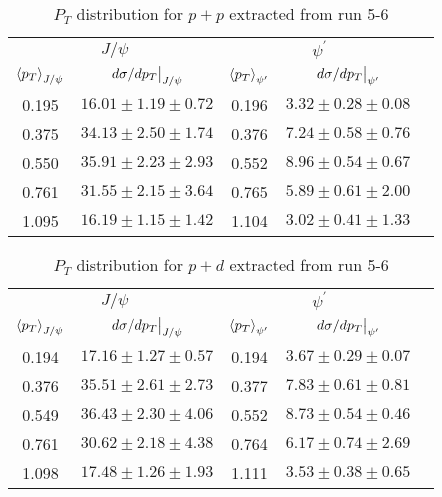 \documentclass[../main.tex]{subfiles}
\begin{document}
\begin{table}[h!]
\centering
\caption{$P_T$ distribution for $p+p$ extracted from run 5-6}
\begin{tabular}{cc|ccc}
\hline
\multicolumn{2}{c|}{$J/\psi$}                               & \multicolumn{2}{c}{$\psi^{\prime}$}                                &  \\ \cline{1-4}
$\expval{p_T}_{J/\psi}$    & $\eval{d\sigma/dp_T}_{J/\psi}$ & $\expval{p_T}_{\psi^\prime}$ & $\eval{d\sigma/dp_T}_{\psi^\prime}$ &  \\ \cline{1-4}
\multicolumn{1}{c|}{0.195} & $16.01\pm1.19\pm0.72$          & \multicolumn{1}{c|}{0.196}   & $3.32\pm0.28\pm0.08$                &  \\
\multicolumn{1}{c|}{0.375} & $34.13\pm2.50\pm1.74$          & \multicolumn{1}{c|}{0.376}   & $7.24\pm0.58\pm0.76$                &  \\
\multicolumn{1}{c|}{0.550} & $35.91\pm2.23\pm2.93$          & \multicolumn{1}{c|}{0.552}   & $8.96\pm0.54\pm0.67$                &  \\
\multicolumn{1}{c|}{0.761} & $31.55\pm2.15\pm3.64$          & \multicolumn{1}{c|}{0.765}   & $5.89\pm0.61\pm2.00$                &  \\
\multicolumn{1}{c|}{1.095} & $16.19\pm1.15\pm1.42$          & \multicolumn{1}{c|}{1.104}   & $3.02\pm0.41\pm1.33$                &  \\ \cline{1-4}
\end{tabular}
\end{table}
\begin{table}[h!]
\centering
\caption{$P_T$ distribution for $p+d$ extracted from run 5-6}
\begin{tabular}{cc|ccc}
\hline
\multicolumn{2}{c|}{$J/\psi$}                               & \multicolumn{2}{c}{$\psi^{\prime}$}                                &  \\ \cline{1-4}
$\expval{p_T}_{J/\psi}$    & $\eval{d\sigma/dp_T}_{J/\psi}$ & $\expval{p_T}_{\psi^\prime}$ & $\eval{d\sigma/dp_T}_{\psi^\prime}$ &  \\ \cline{1-4}
\multicolumn{1}{c|}{0.194} & $17.16\pm1.27\pm0.57$          & \multicolumn{1}{c|}{0.194}   & $3.67\pm0.29\pm0.07$                &  \\
\multicolumn{1}{c|}{0.376} & $35.51\pm2.61\pm2.73$          & \multicolumn{1}{c|}{0.377}   & $7.83\pm0.61\pm0.81$                &  \\
\multicolumn{1}{c|}{0.549} & $36.43\pm2.30\pm4.06$          & \multicolumn{1}{c|}{0.552}   & $8.73\pm0.54\pm0.46$                &  \\
\multicolumn{1}{c|}{0.761} & $30.62\pm2.18\pm4.38$          & \multicolumn{1}{c|}{0.764}   & $6.17\pm0.74\pm2.69$                &  \\
\multicolumn{1}{c|}{1.098} & $17.48\pm1.26\pm1.93$          & \multicolumn{1}{c|}{1.111}   & $3.53\pm0.38\pm0.65$                &  \\ \cline{1-4}
\end{tabular}
\end{table}
\end{document}
